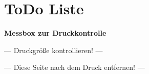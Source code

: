 \chapter{ToDo Liste}


\centering \Large \textbf{Messbox zur Druckkontrolle}

\begin{center}
	{\Large --- Druckgröße kontrollieren! ---}
	
	\bigskip
	
	
	\bigskip
	
	{\Large --- Diese Seite nach dem Druck entfernen! ---}
	
\end{center}